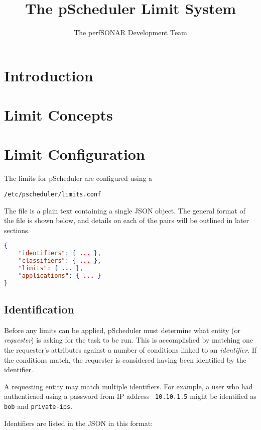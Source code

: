 \documentclass[10pt,titlepage]{article}
\title{The pScheduler Limit System}
\author{The perfSONAR Development Team}
\begin{document}
\maketitle
\tableofcontents



\section{Introduction}

\section{Limit Concepts}


\section{Limit Configuration}
The limits for pScheduler are configured using a 

{\tt /etc/pscheduler/limits.conf}

The file is a plain text containing a single JSON object.  The general
format of the file is shown below, and details on each of the pairs
will be outlined in later sections.

\begin{lstlisting}[language=json]
{
    "identifiers": { ... },
    "classifiers": { ... },
    "limits": { ... },
    "applications": { ... }
}
\end{lstlisting}



\subsection{Identification}

Before any limits can be applied, pScheduler must determine what
entity (or {\it requester}) is asking for the task to be run.  This is
accomplished by matching one the requester's attributes against a
number of conditions linked to an {\it identifier}.  If the conditions
match, the requester is considered having been identified by the
identifier.  

A requesting entity may match multiple identifiers.  For example, a
user who had authenticaed using a password from IP address {\tt
  10.10.1.5} might be identified as {\tt bob} and {\tt private-ips}.

Identifiers are listed in the JSON in this format:
\end{document}
